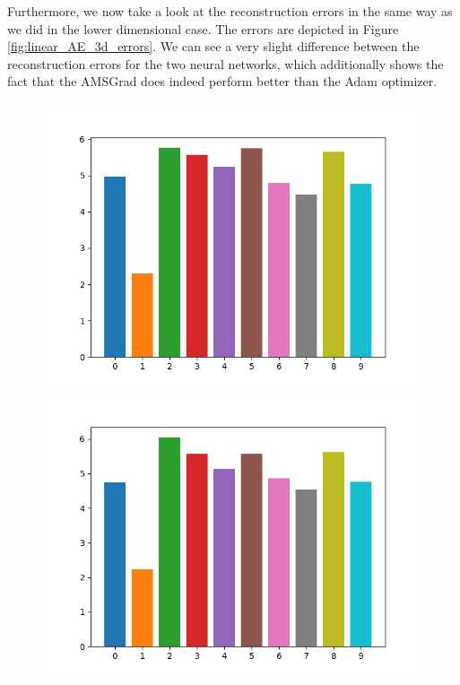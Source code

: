 Furthermore, we now take a look at the reconstruction errors in the same way as we did in the lower dimensional case. The errors are depicted in Figure \ref{fig:linear_AE_3d_errors}. We can see a very slight difference between the reconstruction errors for the two neural networks, which additionally shows the fact that the AMSGrad does indeed perform better than the Adam optimizer.



\begin{figure}
\begin{center}
   \begin{minipage}[b]{0.49\linewidth}
      \includegraphics[trim = 15mm 5mm 15mm 10mm, clip, width=\linewidth]{linear_AE_3d_adam_errors}
	\end{minipage}
   \begin{minipage}[b]{0.49\linewidth}
      \includegraphics[trim = 15mm 5mm 15mm 10mm, clip, width=\linewidth]{linear_AE_3d_amsgrad_errors}

\end{minipage}
\end{center}
\end{figure}
